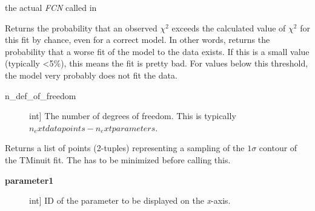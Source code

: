 \documentclass[a4paper,10pt,english]{sphinxmanual}
\begin{document}
\begin{fulllineitems}
\begin{fulllineitems}
\begin{description}
\end{description}

\end{fulllineitems}


\begin{fulllineitems}
\label{index:kafe.minuit.Minuit.function_to_minimize}
the actual \emph{FCN} called in 

\end{fulllineitems}


\begin{fulllineitems}
\label{index:kafe.minuit.Minuit.get_chi2_probability}
Returns the probability that an observed $\chi^2$ exceeds
the calculated value of $\chi^2$ for this fit by chance, even for a correct model.
In other words, returns the probability that a worse fit of the model to the data exists.
If this is a small value (typically \textless{}5\%), this means the fit is pretty bad. For
values below this threshold, the model very probably does not fit the data.
\begin{description}
\item[{n\_def\_of\_freedom}] \leavevmode{[}int{]}
The number of degrees of freedom. This is typically $n_       ext{datapoints} - n_    ext{parameters}$.

\end{description}

\end{fulllineitems}


\begin{fulllineitems}
\label{index:kafe.minuit.Minuit.get_contour}
Returns a list of points (2-tuples) representing a sampling of
the $1\sigma$ contour of the TMinuit fit. The  has to be
minimized before calling this.
\begin{description}
\item[{\textbf{parameter1}}] \leavevmode{[}int{]}
ID of the parameter to be displayed on the \emph{x}-axis.


\end{description}
\end{fulllineitems}
\end{fulllineitems}
\end{document}

